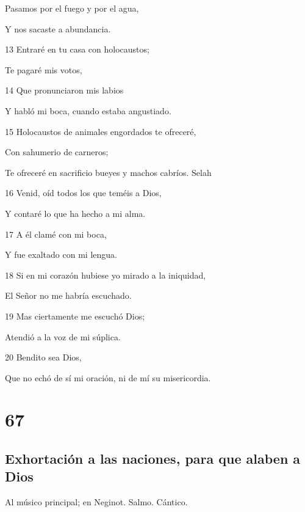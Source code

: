 \par Pasamos por el fuego y por el agua,
\par Y nos sacaste a abundancia.
\par 13 Entraré en tu casa con holocaustos;
\par Te pagaré mis votos,
\par 14 Que pronunciaron mis labios
\par Y habló mi boca, cuando estaba angustiado.
\par 15 Holocaustos de animales engordados te ofreceré,
\par Con sahumerio de carneros;
\par Te ofreceré en sacrificio bueyes y machos cabríos. Selah
\par 16 Venid, oíd todos los que teméis a Dios,
\par Y contaré lo que ha hecho a mi alma.
\par 17 A él clamé con mi boca,
\par Y fue exaltado con mi lengua.
\par 18 Si en mi corazón hubiese yo mirado a la iniquidad,
\par El Señor no me habría escuchado.
\par 19 Mas ciertamente me escuchó Dios;
\par Atendió a la voz de mi súplica.
\par 20 Bendito sea Dios,
\par Que no echó de sí mi oración, ni de mí su misericordia.

\chapter{67}

\section*{Exhortación a las naciones, para que alaben a Dios}

\par Al músico principal; en Neginot. Salmo. Cántico.

